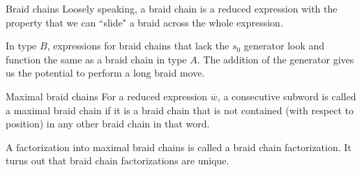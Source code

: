 \documentclass[final]{beamer}
\newcommand{\w}{\overline{w}}
\begin{document}
\begin{frame}{}
\begin{columns}[T]
\begin{column}{.33\linewidth}
\begin{block}{Braid chains}
Loosely speaking, a \alert{braid chain} is a reduced expression with the property that we can ``slide" a braid across the whole expression.
\vspace{1em}
\begin{center}
\end{center}
In type $B$, expressions for braid chains that lack the $s_0$ generator look and function the same as a braid chain in type $A$. The addition of the generator gives us the potential to perform a \alert{long braid} move.

\vspace{1em}
\end{block}


\begin{block}{Maximal braid chains}
For a reduced expression $\w$, a consecutive subword is called a \alert{maximal braid chain} if it is a braid chain that is not contained (with respect to position) in any other braid chain in that word.

\vspace{1em}
A factorization into maximal braid chains is called a \alert{braid chain factorization}. It turns out that braid chain factorizations are unique.
\end{block}



\end{column}
\end{columns}
\end{frame}
\end{document}
